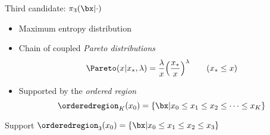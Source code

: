 \documentclass[10pt,xcolor={dvipsnames}]{beamer}
\newcommand{\pgffigure}[2]{%
\scalebox{#2}{}
}
\begin{document}
\begin{frame}{Third candidate: $\pi_3(\bx|\cdot)$}
\vspace{.2cm}


\vspace{.5cm}

\begin{overprint}

\begin{itemize}
\widesep
\item<3-> \alert{Maximum entropy distribution}

\item<4->
\begin{minipage}[t]{.6\textwidth}
Chain of coupled \emph{Pareto distributions}
$$ \Pareto(x|x_*,\lambda) = \frac{\lambda}{x} \qty(\frac{x_*}{x})^\lambda  \qquad (x_* \leq x) $$
\end{minipage}
\begin{minipage}[t]{.3\textwidth}
\vspace{-.3cm}
\begin{figure}
	\pgffigure{pareto-pdf.pgf}{.6}
\end{figure}
\end{minipage}
\vspace{-.5cm}
\item<5->
\begin{minipage}[t]{.6\textwidth}
Supported by the \emph{ordered region}
$$\orderedregion_K(x_0) = \{\bx | x_0 \leq x_1 \leq x_2 \leq \cdots \leq x_K\}$$
\end{minipage}
\begin{minipage}[t]{.3\textwidth}
\vspace{-.3cm}
\begin{figure}
\pgffigure{ordered-region-2d.pgf}{.6}
\end{figure}
\end{minipage}

\end{itemize}

\hspace{-.35cm}
\pgffigure{joint-talk-region.pgf}{.58}
\begin{center}
Support $\orderedregion_3(x_0) = \{\bx | x_0 \leq x_1 \leq x_2 \leq x_3\}$
\end{center}


\end{overprint}
\end{frame}
\end{document}
